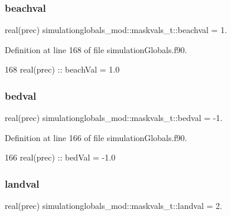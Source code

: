 \subsubsection{\texorpdfstring{beachval}{beachval}}
{\footnotesize\ttfamily real(prec) simulationglobals\+\_\+mod\+::maskvals\+\_\+t\+::beachval = 1.\hspace{0.3cm}{\ttfamily [private]}}



Definition at line 168 of file simulation\+Globals.\+f90.


\begin{DoxyCode}
168         \textcolor{keywordtype}{real(prec)} :: beachVal = 1.0
\end{DoxyCode}
\mbox{\label{structsimulationglobals__mod_1_1maskvals__t_a300c996800a60fde8b960454efa5250b}} 
\subsubsection{\texorpdfstring{bedval}{bedval}}
{\footnotesize\ttfamily real(prec) simulationglobals\+\_\+mod\+::maskvals\+\_\+t\+::bedval = -\/1.\hspace{0.3cm}{\ttfamily [private]}}



Definition at line 166 of file simulation\+Globals.\+f90.


\begin{DoxyCode}
166         \textcolor{keywordtype}{real(prec)} :: bedVal   = -1.0
\end{DoxyCode}
\mbox{\label{structsimulationglobals__mod_1_1maskvals__t_a6b8266db0422df028f6a2abe90382fcf}} 
\subsubsection{\texorpdfstring{landval}{landval}}
{\footnotesize\ttfamily real(prec) simulationglobals\+\_\+mod\+::maskvals\+\_\+t\+::landval = 2.\hspace{0.3cm}{\ttfamily [private]}}



